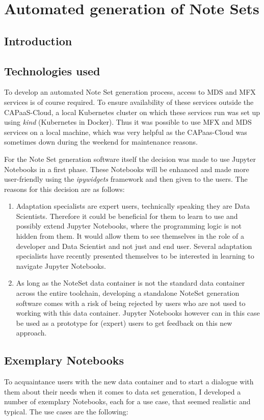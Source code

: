 \chapter{Automated generation of Note Sets}
\label{chap:nsgeneration}

\section{Introduction}
\section{Technologies used}
To develop an automated Note Set generation process, access to MDS and MFX services is of course required. To ensure availability of these services outside the CAPaaS-Cloud, a local Kubernetes cluster on which these services run was set up using \emph{kind} (Kubernetes in Docker). Thus it was possible to use MFX and MDS services on a local machine, which was very helpful as the CAPaas-Cloud was sometimes down during the weekend for maintenance reasons.\par
For the Note Set generation software itself the decision was made to use Jupyter Notebooks in a first phase. These Notebooks will be enhanced and made more user-friendly using the \emph{ipywidgets} framework and then given to the users. The reasons for this decision are as follows:
\begin{enumerate}
  \item Adaptation specialists are expert users, technically speaking they are Data Scientists. Therefore it could be beneficial for them to learn to use and possibly extend Jupyter Notebooks, where the programming logic is not hidden from them. It would allow them to see themselves in the role of a developer and Data Scientist and not just and end user. Several adaptation specialists have recently presented themselves to be interested in learning to navigate Jupyter Notebooks.
  \item As long as the NoteSet data container is not the standard data container across the entire toolchain, developing a standalone NoteSet generation software comes with a risk of being rejected by users who are not used to working with this data container. Jupyter Notebooks however can in this case be used as a prototype for (expert) users to get feedback on this new approach.
\end{enumerate}
\section{Exemplary Notebooks}
To acquaintance users with the new data container and to start a dialogue with them about their needs when it comes to data set generation, I developed a number of exemplary Notebooks, each for a use case, that seemed realistic and typical. The use cases are the following:
